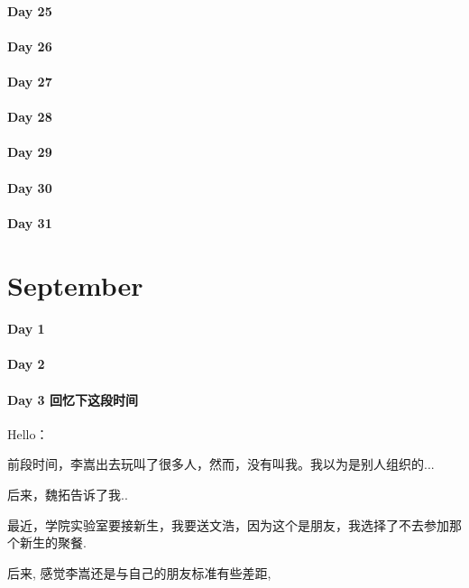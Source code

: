 \documentclass[UTF8,a4paper,8pt]{ctexbook}
\begin{document}
 	 \paragraph{Day 25      \quad     }
 	 \paragraph{Day 26      \quad     }
 	 \paragraph{Day 27      \quad     }
 	 \paragraph{Day 28      \quad     }
 	 \paragraph{Day 29      \quad     }   
 	 \paragraph{Day 30      \quad     }
 	 \paragraph{Day 31      \quad     }
 \section*{September}
 	 \paragraph{Day 1       \quad     }
 	 \paragraph{Day 2       \quad     }
 	 \paragraph{Day 3  回忆下这段时间     \quad     }
	 	 Hello：
	 	 
	 	 前段时间，李嵩出去玩叫了很多人，然而，没有叫我。我以为是别人组织的...
	 	 
	 	 后来，魏拓告诉了我..
	 	 
	 	 最近，学院实验室要接新生，我要送文浩，因为这个是朋友，我选择了不去参加那个新生的聚餐.
	 	 
	 	 后来, 感觉李嵩还是与自己的朋友标准有些差距,
	 	 
\end{document}
